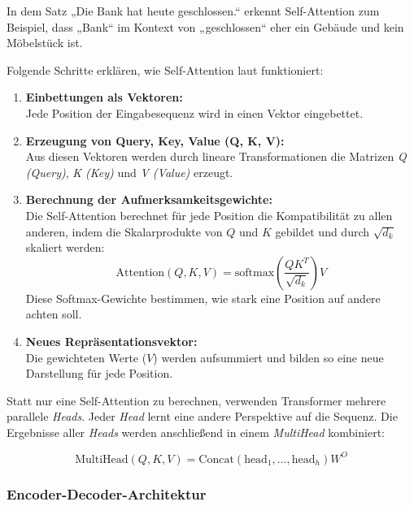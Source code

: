In dem Satz „Die Bank hat heute geschlossen.“ erkennt Self-Attention zum Beispiel, dass „Bank“ im Kontext von „geschlossen“ eher ein Gebäude 
und kein Möbelstück ist. %

Folgende Schritte erklären, wie Self-Attention laut \cite{vaswani2023attentionneed} funktioniert:

\begin{enumerate}
    \item \textbf{Einbettungen als Vektoren:} \\
    Jede Position der Eingabesequenz wird in einen Vektor eingebettet.

    \item \textbf{Erzeugung von Query, Key, Value (Q, K, V):} \\
    Aus diesen Vektoren werden durch lineare Transformationen die Matrizen \textit{Q (Query)}, \textit{K (Key)} und \textit{V (Value)} erzeugt.

    \item \textbf{Berechnung der Aufmerksamkeitsgewichte:} \\
    Die Self-Attention berechnet für jede Position die Kompatibilität zu allen anderen, indem die Skalarprodukte von $Q$ und $K$ gebildet und durch $\sqrt{d_k}$ skaliert werden:
    \[
    \text{Attention}(Q, K, V) = \text{softmax}\left(\frac{QK^T}{\sqrt{d_k}}\right) V
    \]
    Diese Softmax-Gewichte bestimmen, wie stark eine Position auf andere achten soll.

    \item \textbf{Neues Repräsentationsvektor:} \\
    Die gewichteten Werte ($V$) werden aufsummiert und bilden so eine neue Darstellung für jede Position. %
\end{enumerate}

Statt nur eine Self-Attention zu berechnen, verwenden Transformer mehrere parallele \textit{Heads}. Jeder \textit{Head} lernt eine andere Perspektive auf die Sequenz. 
Die Ergebnisse aller \textit{Heads} werden anschließend in einem \textit{MultiHead} kombiniert:

\begin{equation}
   \text{MultiHead}(Q, K, V) = \text{Concat}(\text{head}_1, \ldots, \text{head}_h) W^O 
\end{equation}


\subsubsection{Encoder-Decoder-Architektur} \label{sec:encoder_decoder_architecture}

